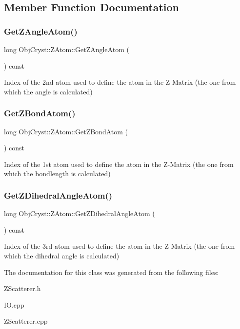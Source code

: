 \subsection{Member Function Documentation}
\mbox{\label{class_obj_cryst_1_1_z_atom_a058aa7bd3176e67001fdb7ee54594793}} 
\subsubsection{\texorpdfstring{GetZAngleAtom()}{GetZAngleAtom()}}
{\footnotesize\ttfamily long Obj\+Cryst\+::\+Z\+Atom\+::\+Get\+Z\+Angle\+Atom (\begin{DoxyParamCaption}{ }\end{DoxyParamCaption}) const}

Index of the 2nd atom used to define the atom in the Z-\/\+Matrix (the one from which the angle is calculated) \mbox{\label{class_obj_cryst_1_1_z_atom_ad562588cedd0e9e3eaee2dae1a4afa3e}} 
\subsubsection{\texorpdfstring{GetZBondAtom()}{GetZBondAtom()}}
{\footnotesize\ttfamily long Obj\+Cryst\+::\+Z\+Atom\+::\+Get\+Z\+Bond\+Atom (\begin{DoxyParamCaption}{ }\end{DoxyParamCaption}) const}

Index of the 1st atom used to define the atom in the Z-\/\+Matrix (the one from which the bondlength is calculated) \mbox{\label{class_obj_cryst_1_1_z_atom_a0c13c96b5329c654de8fa039edaffdee}} 
\subsubsection{\texorpdfstring{GetZDihedralAngleAtom()}{GetZDihedralAngleAtom()}}
{\footnotesize\ttfamily long Obj\+Cryst\+::\+Z\+Atom\+::\+Get\+Z\+Dihedral\+Angle\+Atom (\begin{DoxyParamCaption}{ }\end{DoxyParamCaption}) const}

Index of the 3rd atom used to define the atom in the Z-\/\+Matrix (the one from which the dihedral angle is calculated) 

The documentation for this class was generated from the following files\+:\begin{DoxyCompactItemize}
\item 
Z\+Scatterer.\+h\item 
I\+O.\+cpp\item 
Z\+Scatterer.\+cpp\end{DoxyCompactItemize}

